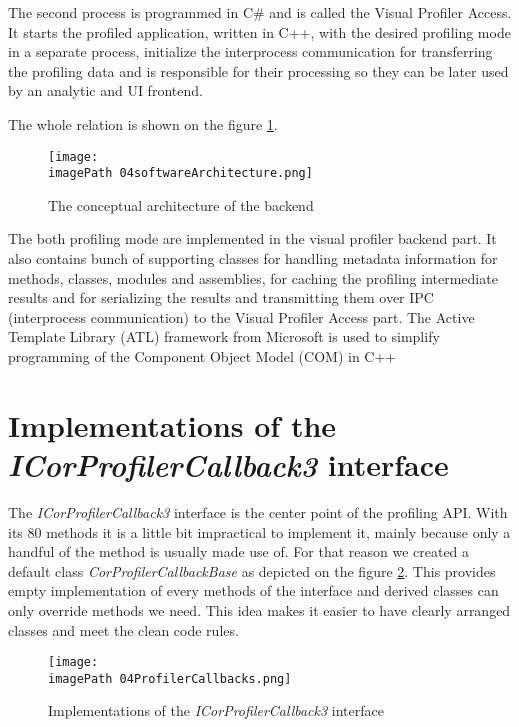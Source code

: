 The second process is programmed in C\# and is called the Visual Profiler Access. It starts the profiled application, written in C++, with the desired profiling mode in a separate process, initialize the interprocess communication for transferring the profiling data and is responsible for their processing so they can be later used by an analytic and UI frontend.

The whole relation is shown on the figure \ref{fig:04softwareArchitecture}.

\begin{figure}
	\centering
		\texttt{[image: \\imagePath 04softwareArchitecture.png]}
		\caption{The conceptual architecture of the backend}
	\label{fig:04softwareArchitecture}
\end{figure}

The both profiling mode are implemented in the visual profiler backend part. It also contains bunch of supporting classes for handling metadata information for methods, classes, modules and assemblies, for caching the profiling intermediate results and for serializing the results and transmitting them over IPC (interprocess communication) to the Visual Profiler Access part. The Active Template Library (ATL) framework from Microsoft is used to simplify programming of the Component Object Model (COM) in C++

\section{Implementations of the \textit{ICorProfilerCallback3 } interface}
The \textit{ICorProfilerCallback3} interface is the center point of the profiling API. With its 80 methods it is a little bit impractical to implement it, mainly because only a handful of the method is usually made use of. For that reason we created a default class \textit{CorProfilerCallbackBase} as depicted on the figure \ref{fig:04ProfilerCallbacks}. This provides empty implementation of every methods of the interface and derived classes can only override methods we need. This idea makes it easier to have clearly arranged classes and meet the clean code rules.

\begin{figure}
	\centering
		\texttt{[image: \\imagePath 04ProfilerCallbacks.png]}
		\caption{Implementations of the \textit{ICorProfilerCallback3} interface}
	\label{fig:04ProfilerCallbacks}
\end{figure}


